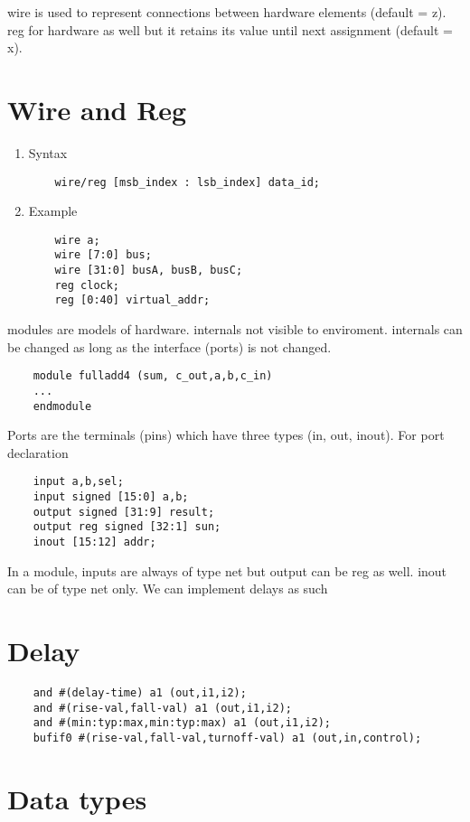 wire is used to represent connections between hardware elements (default = z).
reg for hardware as well but it retains its value until next assignment (default = x).

\section{Wire and Reg}
\begin{enumerate}
    \item Syntax

          \begin{lstlisting}
    wire/reg [msb_index : lsb_index] data_id;
\end{lstlisting}
    \item Example
          \begin{lstlisting}
    wire a;
    wire [7:0] bus;
    wire [31:0] busA, busB, busC;
    reg clock;
    reg [0:40] virtual_addr;
\end{lstlisting}
\end{enumerate}

modules are models of hardware. internals not visible to enviroment. internals can be changed as long as the interface (ports) is not changed.
\begin{lstlisting}
    module fulladd4 (sum, c_out,a,b,c_in)
    ... 
    endmodule  
\end{lstlisting}
Ports are the terminals (pins) which have three types (in, out, inout). For port declaration
\begin{lstlisting}
    input a,b,sel;
    input signed [15:0] a,b;
    output signed [31:9] result;
    output reg signed [32:1] sun;
    inout [15:12] addr;
\end{lstlisting}
In a module, inputs are always of type net but output can be reg as well. inout can be of type net only.
We can implement delays as such
\section{Delay}
\begin{lstlisting}
    and #(delay-time) a1 (out,i1,i2);
    and #(rise-val,fall-val) a1 (out,i1,i2);
    and #(min:typ:max,min:typ:max) a1 (out,i1,i2);
    bufif0 #(rise-val,fall-val,turnoff-val) a1 (out,in,control);
\end{lstlisting}

\section{Data types}
